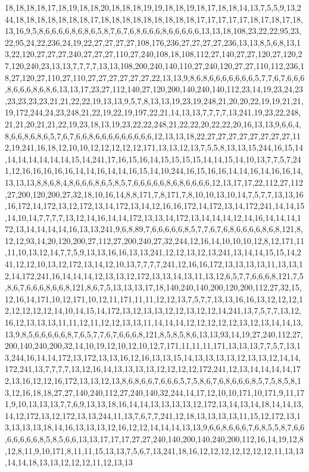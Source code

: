 18,18,18,18,17,18,19,18,18,20,18,18,18,19,19,18,18,19,18,17,18,18,14,13,7,5,5,9,13,244,18,18,18,18,18,18,18,17,18,18,18,18,18,18,18,18,18,17,17,17,17,17,18,17,18,17,18,13,16,9,5,8,6,6,6,6,8,6,8,6,5,8,7,6,7,6,8,6,6,6,8,6,6,6,6,6,13,13,18,108,23,22,22,95,23,22,95,24,22,236,24,19,22,27,27,27,27,108,176,236,27,27,27,27,236,13,13,8,5,6,8,13,13,22,120,27,27,27,240,27,27,27,110,27,240,108,18,108,112,27,140,27,27,120,27,120,27,120,240,23,13,13,7,7,7,7,13,13,108,200,240,140,110,27,240,120,27,27,110,112,236,18,27,120,27,110,27,110,27,27,27,27,27,27,22,13,13,9,8,6,8,6,6,6,6,6,6,6,5,7,7,6,7,6,6,6,8,6,6,6,8,6,8,6,13,13,17,23,27,112,140,27,120,200,140,240,140,112,23,14,19,23,24,23,23,23,23,23,21,21,22,22,19,13,13,9,5,7,8,13,13,19,23,19,248,21,20,20,22,19,19,21,21,19,172,244,24,23,248,21,22,19,22,19,197,22,21,14,13,13,7,7,7,7,13,241,19,23,22,248,21,21,20,21,21,22,19,23,18,13,19,23,22,22,248,21,22,22,20,22,22,20,16,13,13,9,6,6,4,8,6,6,8,6,8,6,5,7,6,7,6,6,8,6,6,6,6,6,6,6,6,6,12,13,13,18,22,27,27,27,27,27,27,27,27,112,19,241,16,18,12,10,10,12,12,12,12,12,171,13,13,12,13,7,5,5,8,13,13,15,244,16,15,14,14,14,14,14,14,14,15,14,241,17,16,15,16,14,15,15,15,15,14,14,15,14,10,13,7,7,5,7,241,12,16,16,16,16,16,14,14,16,14,14,16,15,14,10,244,16,15,16,16,14,14,16,14,16,16,14,13,13,13,8,8,6,8,4,8,6,6,6,8,6,5,8,5,7,6,6,6,6,6,8,6,8,6,6,6,6,12,13,17,17,22,112,27,112,27,200,120,200,27,32,18,10,16,14,8,8,171,7,8,171,7,8,10,10,13,10,14,7,5,7,7,13,13,16,16,172,14,172,13,12,172,13,14,172,13,14,12,16,16,172,14,172,13,14,172,241,14,14,15,14,10,14,7,7,7,7,13,12,14,16,14,14,172,13,13,14,172,13,14,14,14,12,14,16,14,14,14,172,13,14,14,14,14,16,13,13,241,9,6,8,89,7,6,6,6,6,6,8,5,7,7,6,7,6,8,6,6,6,6,8,6,8,121,8,12,12,93,14,20,120,200,27,112,27,200,240,27,32,244,12,16,14,10,10,10,12,8,12,171,11,11,10,13,12,14,7,7,5,9,13,13,16,16,13,13,241,12,12,13,12,13,241,13,14,14,15,15,14,241,12,12,10,13,12,172,13,14,12,10,13,7,7,7,7,241,12,16,16,172,13,13,13,13,11,13,13,12,14,172,241,16,14,14,14,12,13,13,12,172,13,13,14,13,11,13,12,6,5,7,7,6,6,6,8,121,7,5,8,6,7,6,6,6,8,6,6,8,121,8,6,7,5,13,13,13,17,18,140,240,140,200,120,200,112,27,32,15,12,16,14,171,10,12,171,10,12,11,171,11,11,12,12,13,7,5,7,7,13,13,16,16,13,12,12,12,12,12,12,12,12,14,10,14,15,14,172,13,12,13,13,12,12,13,12,12,14,241,13,7,5,7,7,13,12,16,12,13,13,13,11,11,12,11,12,12,13,13,11,14,14,14,12,12,12,12,12,13,12,13,14,14,13,13,9,8,5,6,6,6,6,6,8,7,6,5,7,7,6,7,6,6,6,8,121,8,5,8,5,8,6,13,13,93,14,19,27,240,112,27,200,140,240,200,32,14,10,19,12,10,12,10,12,7,171,11,11,11,171,13,13,13,7,7,5,7,13,13,244,16,14,14,172,13,172,13,13,16,12,16,13,13,15,14,13,13,13,13,12,13,13,12,14,14,172,241,13,7,7,7,7,13,12,16,14,13,13,13,13,12,12,12,12,172,241,12,13,14,14,14,14,172,13,16,12,12,16,172,13,13,12,13,8,6,8,6,6,7,6,6,6,5,7,5,8,6,7,6,8,6,6,6,8,5,7,5,8,5,8,13,12,16,18,18,27,27,140,240,112,27,240,140,32,244,14,17,12,10,10,171,10,171,9,11,171,9,10,13,13,13,7,7,6,9,13,13,18,16,14,14,13,13,13,13,12,172,13,14,13,14,18,14,14,13,14,12,172,13,12,172,13,13,244,11,13,7,6,7,7,241,12,18,13,13,13,13,11,15,12,172,13,13,13,13,13,18,14,16,13,13,13,12,16,12,12,14,14,14,13,13,9,6,6,8,6,6,6,7,6,8,5,5,8,7,6,6,6,6,6,6,6,8,5,8,5,6,6,13,13,17,17,17,27,27,240,140,200,140,240,200,112,16,14,19,12,8,12,8,11,9,10,171,8,11,11,15,13,13,7,5,6,7,13,241,18,16,12,12,12,12,12,12,12,11,13,13,14,14,18,13,13,12,12,12,11,12,13,13